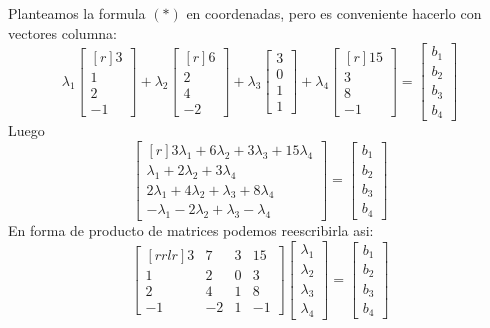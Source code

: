 \documentclass{article}
\theoremstyle{definition}
\theoremstyle{definition}
\theoremstyle{remark}
\begin{document}
Planteamos la formula $(*)$ en coordenadas, pero es conveniente hacerlo con vectores columna: \[
  \lambda_1 \begin{bmatrix}[r]3 \\ 1  \\ 2 \\ -1 \end{bmatrix} + \lambda_2 \begin{bmatrix}[r]6 \\ 2 \\ 4\\ -2 \end{bmatrix} + \lambda_3 \begin{bmatrix}3 \\ 0 \\ 1 \\ 1 \end{bmatrix} + \lambda_4  \begin{bmatrix}[r]15 \\ 3 \\ 8 \\ -1 \end{bmatrix}=\begin{bmatrix}b_1 \\ b_2 \\b_3 \\b_4 \end{bmatrix}
\]
Luego \[
  \begin{bmatrix}[r]3\lambda_1+6\lambda_2+3\lambda_3 + 15\lambda_4 \\
  \lambda_1+2\lambda_2 + 3\lambda_4 \\
  2 \lambda_1 + 4\lambda_2 + \lambda_3 + 8\lambda_4 \\
  -\lambda_1-2\lambda_2+\lambda_3 -\lambda_4 
  \end{bmatrix}=\begin{bmatrix}b_1 \\ b_2 \\ b_3 \\ b_4 \end{bmatrix}
\]
En forma de producto de matrices podemos reescribirla asi: \[
  \begin{bmatrix}[rrlr]3 & 7 & 3 & 15 \\ 1 & 2 & 0 & 3 \\ 2 & 4 & 1 & 8 \\ -1 & -2 & 1 & -1 \end{bmatrix}\begin{bmatrix} \lambda_1 \\ \lambda_2 \\ \lambda_3 \\ \lambda_4 \end{bmatrix}=\begin{bmatrix} b_1 \\ b_2 \\b_3 \\b_4 \end{bmatrix}
\]
\end{document}
